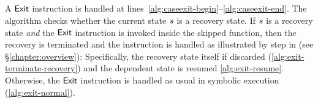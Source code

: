 \subsection{}
A $\mathsf{Exit}$ instruction is handled
at lines~\ref{alg:caseexit-begin}--\ref{alg:caseexit-end}.
The algorithm checks whether the current state $s$ is a
recovery state. If $s$ is a recovery state \emph{and} the
$\mathsf{Exit}$ instruction is invoked inside the skipped function,
then the recovery is terminated and the instruction is handled as
illustrated by step  in  (see
\S\ref{chapter:overview}): Specifically, the recovery state itself if
discarded (\cref{alg:exit-terminate-recovery}) and the dependent state
is resumed \cref{alg:exit-resume}. Otherwise, the $\mathsf{Exit}$
instruction is handled as usual in symbolic execution
(\cref{alg:exit-normal}).



